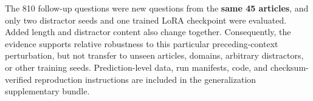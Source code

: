 The 810 follow-up questions were new questions from the \textbf{same 45 articles}, and only two distractor seeds and one trained LoRA checkpoint were evaluated. Added length and distractor content also change together. Consequently, the evidence supports relative robustness to this particular preceding-context perturbation, but not transfer to unseen articles, domains, arbitrary distractors, or other training seeds. Prediction-level data, run manifests, code, and checksum-verified reproduction instructions are included in the generalization supplementary bundle.
